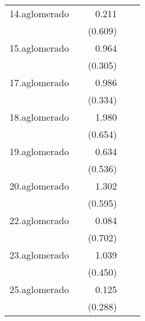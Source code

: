 {\begin{longtable}{l*{4}{D{.}{.}{-1}}}
\addlinespace
14.aglomerado&                     &       0.211         &                     &                     \\
            &                     &     (0.609)         &                     &                     \\
\addlinespace
15.aglomerado&                     &       0.964\sym{**} &                     &                     \\
            &                     &     (0.305)         &                     &                     \\
\addlinespace
17.aglomerado&                     &       0.986\sym{**} &                     &                     \\
            &                     &     (0.334)         &                     &                     \\
\addlinespace
18.aglomerado&                     &       1.980\sym{**} &                     &                     \\
            &                     &     (0.654)         &                     &                     \\
\addlinespace
19.aglomerado&                     &       0.634         &                     &                     \\
            &                     &     (0.536)         &                     &                     \\
\addlinespace
20.aglomerado&                     &       1.302\sym{*}  &                     &                     \\
            &                     &     (0.595)         &                     &                     \\
\addlinespace
22.aglomerado&                     &       0.084         &                     &                     \\
            &                     &     (0.702)         &                     &                     \\
\addlinespace
23.aglomerado&                     &       1.039\sym{*}  &                     &                     \\
            &                     &     (0.450)         &                     &                     \\
\addlinespace
25.aglomerado&                     &       0.125         &                     &                     \\
            &                     &     (0.288)         &                     &                     \\

\end{longtable}}
